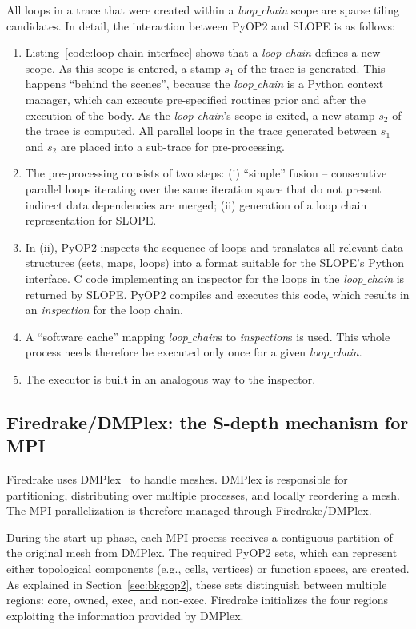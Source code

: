All loops in a trace that were created within a {\em loop$\_$chain} scope are sparse tiling candidates. In detail, the interaction between PyOP2 and SLOPE is as follows:
\begin{enumerate}
\item Listing~\ref{code:loop-chain-interface} shows that a {\em loop$\_$chain} defines a new scope. As this scope is entered, a stamp $s_1$ of the trace is generated. This happens ``behind the scenes'', because the {\em loop$\_$chain} is a Python context manager, which can execute pre-specified routines prior and after the execution of the body. As the {\em loop$\_$chain}'s scope is exited, a new stamp $s_2$ of the trace is computed. All parallel loops in the trace generated between $s_1$ and $s_2$ are placed into a sub-trace for pre-processing.
\item The pre-processing consists of two steps: (i) ``simple'' fusion -- consecutive parallel loops iterating over the same iteration space that do not present indirect data dependencies are merged; (ii) generation of a loop chain representation for SLOPE.
\item In (ii), PyOP2 inspects the sequence of loops and translates all relevant data structures (sets, maps, loops) into a format suitable for the SLOPE's Python interface. C code implementing an inspector for the loops in the {\em loop$\_$chain} is returned by SLOPE. PyOP2 compiles and executes this code, which results in an {\em inspection} for the loop chain.
\item A ``software cache'' mapping {\em loop$\_$chain}s to {\em inspection}s is used. This whole process needs therefore be executed only once for a given {\em loop$\_$chain}. 
\item The executor is built in an analogous way to the inspector.
\end{enumerate}


\subsection{Firedrake/DMPlex: the S-depth mechanism for MPI}
\label{sec:tiling:impl-firedrake}
Firedrake uses DMPlex~\citep{dmplex-cite} to handle meshes. DMPlex is responsible for partitioning, distributing over multiple processes, and locally reordering a mesh. The MPI parallelization is therefore managed through Firedrake/DMPlex.

During the start-up phase, each MPI process receives a contiguous partition of the original mesh from DMPlex. The required PyOP2 sets, which can represent either topological components (e.g., cells, vertices) or function spaces, are created. As explained in Section~\ref{sec:bkg:op2}, these sets distinguish between multiple regions: core, owned, exec, and non-exec. Firedrake initializes the four regions exploiting the information provided by DMPlex. 

